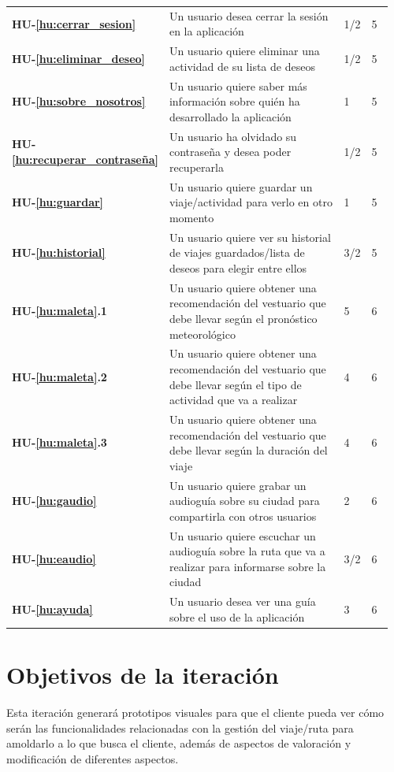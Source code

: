 \documentclass[11pt]{article}
\begin{document}
\begin{longtable}{p{0.12\linewidth}p{0.7\linewidth}p{0.07\linewidth}p{0.07\linewidth}}
  \textbf{HU-\ref{hu:cerrar_sesion}} & Un usuario desea cerrar la sesión en la aplicación & 1/2 & 5 \\
  \textbf{HU-\ref{hu:eliminar_deseo}} & Un usuario quiere eliminar una actividad de su lista de deseos & 1/2 & 5 \\
  \textbf{HU-\ref{hu:sobre_nosotros}} & Un usuario quiere saber más información sobre quién ha desarrollado la aplicación & 1 & 5 \\ 
  \textbf{HU-\ref{hu:recuperar_contraseña}} & Un usuario ha olvidado su contraseña y desea poder recuperarla & 1/2 & 5 \\  \textbf{HU-\ref{hu:guardar}} & Un usuario quiere guardar un viaje/actividad para verlo en otro momento & 1 & 5\\ 
  \textbf{HU-\ref{hu:historial}} & Un usuario quiere ver su historial de viajes guardados/lista de deseos para elegir entre ellos & 3/2 & 5\\
  \textbf{HU-\ref{hu:maleta}.1} & Un usuario quiere obtener una recomendación del vestuario que debe llevar según el pronóstico meteorológico & 5 & 6\\
  \textbf{HU-\ref{hu:maleta}.2} & Un usuario quiere obtener una recomendación del vestuario que debe llevar según el tipo de actividad que va a realizar & 4 & 6\\
  \textbf{HU-\ref{hu:maleta}.3} & Un usuario quiere obtener una recomendación del vestuario que debe llevar según la duración del viaje & 4 & 6\\
  \textbf{HU-\ref{hu:gaudio}} & Un usuario quiere grabar un audioguía sobre su ciudad para compartirla con otros usuarios & 2 & 6\\
  \textbf{HU-\ref{hu:eaudio}} & Un usuario quiere escuchar un audioguía sobre la ruta que va a realizar para informarse sobre la ciudad & 3/2 & 6\\
  \textbf{HU-\ref{hu:ayuda}} & Un usuario desea ver una guía sobre el uso de la aplicación & 3 & 6 \\

  \bottomrule
\end{longtable}


\section{Objetivos de la iteración}

Esta iteración generará prototipos visuales para que el cliente pueda ver cómo serán las funcionalidades relacionadas con la gestión del viaje/ruta para amoldarlo a lo que busca el cliente, además de aspectos de valoración y modificación de diferentes aspectos.
\end{document}
